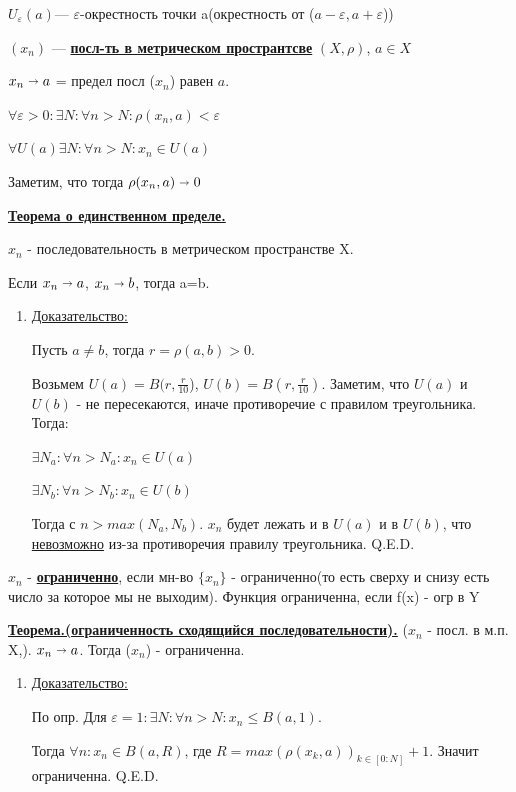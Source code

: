 \documentclass{article}
\newcommand{\deff}[1]{\underline{\textbf{#1}}}
\newcommand{\thmm}[1]{\underline{\textbf{#1}}}
\begin{document}
$U_{\varepsilon}(a)$--- $\varepsilon$-окрестность точки a(окрестность от ($a-\varepsilon, a+\varepsilon$))

$(x_n)$ --- \deff{посл-ть в метрическом пространтсве} $(X, \rho)$, $a \in X$

$x_n \shortrightarrow a$ =  предел посл ($x_n$) равен $a$.

$\forall \varepsilon > 0: \exists N: \forall n>N:\rho(x_n,a)<\varepsilon$

$\forall U(a) \exists N: \forall n>N: x_n \in U(a)$

Заметим, что тогда $\rho (x_n,a) \shortrightarrow 0$

\thmm{Теорема о единственном пределе.}

 $x_n$ - последовательность в метрическом пространстве X. 

Если $x_n \shortrightarrow a$, $x_n \shortrightarrow b$, тогда a=b.

\begin{enumerate}
\item[] \uline{Доказательство:}

Пусть $a \neq b$, тогда $r= \rho(a,b)>0$.

Возьмем $U(a)=B(r,\frac{r}{10}$), $U(b)=B(r,\frac{r}{10})$. Заметим, что $U(a)$ и $U(b)$ - не пересекаются, иначе противоречие с правилом треугольника. Тогда:


$\exists N_a : \forall n> N_a: x_n \in U(a)$

$\exists N_b : \forall n> N_b: x_n \in U(b)$

Тогда с $n > max(N_a,N_b)$. $x_n$ будет лежать и в $U(a)$ и в $U(b)$, что \uline{невозможно} из-за противоречия правилу треугольника. Q.E.D.
\end{enumerate}

$x_n$ - \deff{ограниченно}, если мн-во $\{x_n\}$ - ограниченно(то есть сверху и снизу есть число за которое мы не выходим). Функция ограниченна, если f(x) - огр в Y

\thmm{Теорема.(ограниченность сходящийся последовательности).} ($x_n$ - посл. в м.п. X,). $x_n \shortrightarrow a$. Тогда ($x_n$) - ограниченна.



\begin{enumerate}
    \item[] \uline{Доказательство:}
    
    По опр. Для $\varepsilon = 1: \exists N: \forall n> N: x_n \leq B(a,1)$.

    Тогда $\forall n: x_n \in B(a,R)$, где $R=max(\rho(x_k,a))_{k \in [0:N]} +1 $. Значит ограниченна. Q.E.D.
    
\end{enumerate}
\end{document}
